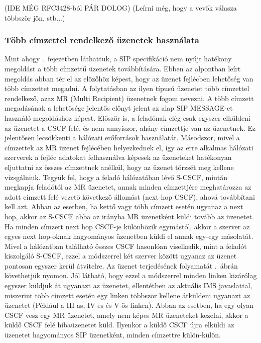 {\color{red}(IDE MÉG RFC3428-ból PÁR DOLOG)
(Leírni még, hogy a vevők válasza többször jön, stb...)}

\subsubsection{Több címzettel rendelkező üzenetek használata}
\label{sec:mr_message}

Mint ahogy .~fejezetben láthattuk, a SIP specifikáció nem nyújt hatékony megoldást a több címzettű üzenetek továbbítására. Ebben az alpontban leírt megoldás abban tér el az előzőhöz képest, hogy az üzenet fejlécben lehetőség van több címzettet megadni. A folytatásban az ilyen típusú üzenetet több címzettel rendelkező, azaz MR (Multi Recipient) üzenetnek fogom nevezni. A több címzett megadásának a lehetősége jelentős előnyt jelent az alap SIP MESSAGE-et használó megoldáshoz képest. Először is, a feladónak elég csak egyszer elküldeni az üzenetet a CSCF felé, és nem annyiszor, ahány címzettje van az üzenetnek. Ez jelentősen lecsökkenti a hálózati erőforrások használatát. Másodszor, mivel a címzettek az MR üzenet fejlécében helyezkednek el, így az erre alkalmas hálózati szerverek a fejléc adatokat felhasználva képesek az üzeneteket hatékonyan eljuttatni az összes címzettnek anélkül, hogy az üzenet törzsét meg kellene vizsgálniuk. Tegyük fel, hogy a feladó hálózatában lévő S-CSCF, miután megkapja feladótól az MR üzenetet, annak minden címzettjére meghatározza az adott címzett felé vezető következő állomást (next hop CSCF), ahová továbbítani kell azt. Abban az esetben, ha kettő vagy több címzett esetén ugyanaz a next hop, akkor az S-CSCF abba az irányba MR üzenetként küldi tovább az üzenetet. Ha minden címzett next hop CSCF-je különbözik egymástól, akkor a szerver az egyes next hop-oknak hagyományos üzenetben küldi el annak egy-egy másolatát. Mivel a hálózatban található összes CSCF hasonlóan viselkedik, mint a feladót kiszolgáló S-CSCF, ezzel a módszerrel két szerver között ugyanaz az üzenet pontosan egyszer kerül átvitelre. Az üzenet terjedésének folyamatát .~ábrán követhetjük nyomon. Jól látható, hogy ezzel a módszerrel minden linken kizárólag egyszer küldjük át ugyanazt az üzenetet, ellentétben az aktuális IMS javaslattal, miszerint több címzett esetén egy linken többször kellene átküldeni ugyanazt az üzenetet (Például a III-as, IV-es és V-ös linken). Abban az esetben, ha egy olyan CSCF vesz egy MR üzenetet, amely nem képes MR üzeneteket kezelni, akkor a küldő CSCF felé hibaüzenetet küld. Ilyenkor a küldő CSCF újra elküldi az üzenetet hagyományos SIP üzenetként, minden címzettre külön-külön. 

